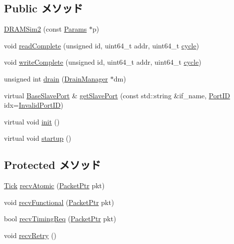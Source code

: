 \subsection*{Public メソッド}
\begin{DoxyCompactItemize}
\item 
\hyperlink{classDRAMSim2_ab8d8de0105b7d92ea63130025ee2bc5a}{DRAMSim2} (const \hyperlink{classDRAMSim2_ae66665a06c9d64a6ba0e56d589b74d6c}{Params} $\ast$p)
\item 
void \hyperlink{classDRAMSim2_a8c698c38274256cd03843f1296ac9eed}{readComplete} (unsigned id, uint64\_\-t addr, uint64\_\-t \hyperlink{classClockedObject_a5dd7a975aae396561aafab3faa698033}{cycle})
\item 
void \hyperlink{classDRAMSim2_aeb50ab991dbcebefc4952362893d0891}{writeComplete} (unsigned id, uint64\_\-t addr, uint64\_\-t \hyperlink{classClockedObject_a5dd7a975aae396561aafab3faa698033}{cycle})
\item 
unsigned int \hyperlink{classDRAMSim2_aa8a18d230dba7a674ac8a0b4f35bc36a}{drain} (\hyperlink{classDrainManager}{DrainManager} $\ast$dm)
\item 
virtual \hyperlink{classBaseSlavePort}{BaseSlavePort} \& \hyperlink{classDRAMSim2_ac918a145092d7514ebc6dbd952dceafb}{getSlavePort} (const std::string \&if\_\-name, \hyperlink{base_2types_8hh_acef4d7d41cb21fdc252e20c04cd7bb8e}{PortID} idx=\hyperlink{base_2types_8hh_a65bf40f138cf863f0c5e2d8ca1144126}{InvalidPortID})
\item 
virtual void \hyperlink{classDRAMSim2_a02fd73d861ef2e4aabb38c0c9ff82947}{init} ()
\item 
virtual void \hyperlink{classDRAMSim2_aecc7d8debf54990ffeaaed5bac7d7d81}{startup} ()
\end{DoxyCompactItemize}
\subsection*{Protected メソッド}
\begin{DoxyCompactItemize}
\item 
\hyperlink{base_2types_8hh_a5c8ed81b7d238c9083e1037ba6d61643}{Tick} \hyperlink{classDRAMSim2_a5f0b4c4a94f6b0053f9d7a4eb9c2518a}{recvAtomic} (\hyperlink{classPacket}{PacketPtr} pkt)
\item 
void \hyperlink{classDRAMSim2_aeefa907fb6d6a787e6dab90e8138ea90}{recvFunctional} (\hyperlink{classPacket}{PacketPtr} pkt)
\item 
bool \hyperlink{classDRAMSim2_a3344d9dd0f83257feab5424e761f31c6}{recvTimingReq} (\hyperlink{classPacket}{PacketPtr} pkt)
\item 
void \hyperlink{classDRAMSim2_a29cb5a4f98063ce6e9210eacbdb35298}{recvRetry} ()
\end{DoxyCompactItemize}
